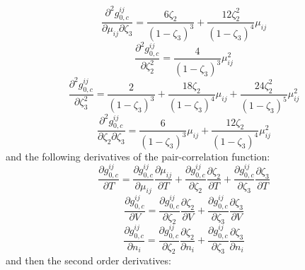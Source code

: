\documentclass[english]{../thermomemo/thermomemo}
\newcommand{\z}{\zeta}
\begin{document}
\begin{equation}
\frac{\partial^2 g_{0,c}^{ij}}{\partial \mu_{ij}\partial \z_3}=\frac{6\z_2}{(1-\z_3)^3}+\frac{12\z_2^2}{(1-\z_3)^4}\mu_{ij}
\end{equation}
\begin{equation}
\frac{\partial^2 g_{0,c}^{ij}}{\partial \z_2^2}=\frac{4}{(1-\z_3)^3}\mu_{ij}^2
\end{equation}
\begin{equation}
\frac{\partial^2 g_{0,c}^{ij}}{\partial \z_3^2}=\frac{2}{(1-\z_3)^3}+\frac{18\z_2}{(1-\z_3)^4}\mu_{ij}+\frac{24\z_2^2}{(1-\z_3)^5}\mu_{ij}^2
\end{equation}
\begin{equation}
\frac{\partial^2 g_{0,c}^{ij}}{\partial \z_2\partial \z_3}=\frac{6}{(1-\z_3)^3}\mu_{ij}+\frac{12\z_2}{(1-\z_3)^4}\mu_{ij}^2
\end{equation}
and the following derivatives of the pair-correlation function:
\begin{equation}
\frac{\partial g_{0,c}^{ij}}{\partial T}=\frac{\partial g_{0,c}^{ij}}{\partial \mu_{ij}}\frac{\partial \mu_{ij}}{\partial T}+\frac{\partial g_{0,c}^{ij}}{\partial \z_{2}}\frac{\partial \z_{2}}{\partial T}+\frac{\partial g_{0,c}^{ij}}{\partial \z_{3}}\frac{\partial \z_{3}}{\partial T} 
\end{equation}
\begin{equation}
\frac{\partial g_{0,c}^{ij}}{\partial V}=\frac{\partial g_{0,c}^{ij}}{\partial \z_{2}}\frac{\partial \z_{2}}{\partial V}+\frac{\partial g_{0,c}^{ij}}{\partial \z_{3}}\frac{\partial \z_{3}}{\partial V} 
\end{equation}
\begin{equation}
\frac{\partial g_{0,c}^{ij}}{\partial n_i}=\frac{\partial g_{0,c}^{ij}}{\partial \z_{2}}\frac{\partial \z_{2}}{\partial n_i}+\frac{\partial g_{0,c}^{ij}}{\partial \z_{3}}\frac{\partial \z_{3}}{\partial n_i} 
\end{equation}
and then the second order derivatives:
\end{document}
